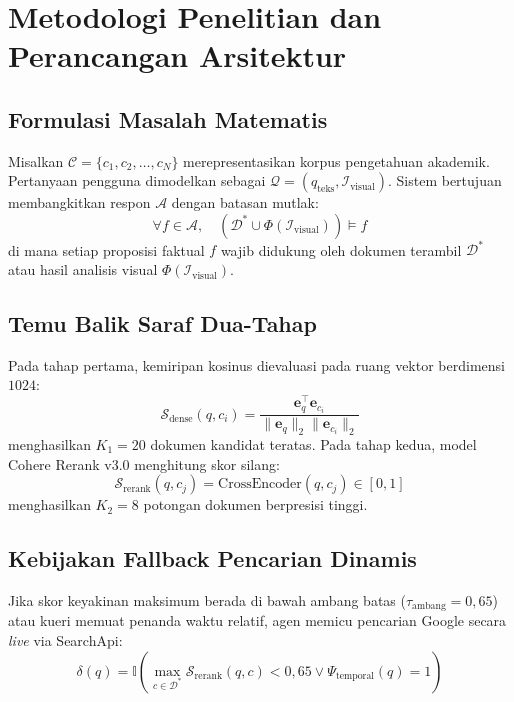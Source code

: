 \documentclass[conference]{IEEEtran}
\begin{document}
\section{Metodologi Penelitian dan Perancangan Arsitektur}
\subsection{Formulasi Masalah Matematis}
Misalkan $\mathcal{C} = \{c_1, c_2, \dots, c_N\}$ merepresentasikan korpus pengetahuan akademik. Pertanyaan pengguna dimodelkan sebagai $\mathcal{Q} = (q_{\text{teks}}, \mathcal{I}_{\text{visual}})$. Sistem bertujuan membangkitkan respon $\mathcal{A}$ dengan batasan mutlak:
\begin{equation}
\forall f \in \mathcal{A}, \quad (\mathcal{D}^* \cup \Phi(\mathcal{I}_{\text{visual}})) \models f
\end{equation}
di mana setiap proposisi faktual $f$ wajib didukung oleh dokumen terambil $\mathcal{D}^*$ atau hasil analisis visual $\Phi(\mathcal{I}_{\text{visual}})$.

\subsection{Temu Balik Saraf Dua-Tahap}
Pada tahap pertama, kemiripan kosinus dievaluasi pada ruang vektor berdimensi $1024$:
\begin{equation}
\mathcal{S}_{\text{dense}}(q, c_i) = \frac{\mathbf{e}_q^\top \mathbf{e}_{c_i}}{\|\mathbf{e}_q\|_2 \|\mathbf{e}_{c_i}\|_2}
\end{equation}
menghasilkan $K_1 = 20$ dokumen kandidat teratas. Pada tahap kedua, model Cohere Rerank v3.0 menghitung skor silang:
\begin{equation}
\mathcal{S}_{\text{rerank}}(q, c_j) = \text{CrossEncoder}(q, c_j) \in [0, 1]
\end{equation}
menghasilkan $K_2 = 8$ potongan dokumen berpresisi tinggi.

\subsection{Kebijakan Fallback Pencarian Dinamis}
Jika skor keyakinan maksimum berada di bawah ambang batas ($\tau_{\text{ambang}} = 0{,}65$) atau kueri memuat penanda waktu relatif, agen memicu pencarian Google secara \textit{live} via SearchApi:
\begin{equation}
\delta(q) = \mathbb{I}\left( \max_{c \in \mathcal{D}^*} \mathcal{S}_{\text{rerank}}(q, c) < 0{,}65 \lor \Psi_{\text{temporal}}(q) = 1 \right)
\end{equation}
\end{document}
